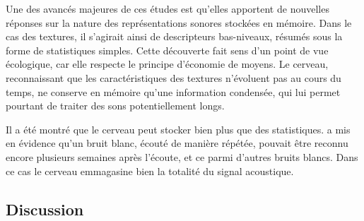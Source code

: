 Une des avancés majeures de ces études est qu'elles apportent de nouvelles réponses sur la nature des représentations sonores stockées en mémoire. Dans le cas des textures, il s'agirait ainsi de descripteurs bas-niveaux, résumés sous la forme de statistiques simples. Cette découverte fait sens d'un point de vue écologique, car elle respecte le principe d'économie de moyens. Le cerveau, reconnaissant que les caractéristiques des textures n'évoluent pas au cours du temps, ne conserve en mémoire qu'une information condensée, qui lui permet pourtant de traiter des sons potentiellement longs. 

Il a été montré que le cerveau peut stocker bien plus que des statistiques. \citep{agus2010rapid} a mis en évidence qu'un bruit blanc, écouté de manière répétée, pouvait être reconnu encore plusieurs semaines après l'écoute, et ce parmi d'autres bruits blancs. Dans ce cas le cerveau emmagasine bien la totalité du signal acoustique.

\subsection{Discussion}
\label{sec:ch3_textureDiscussion}



